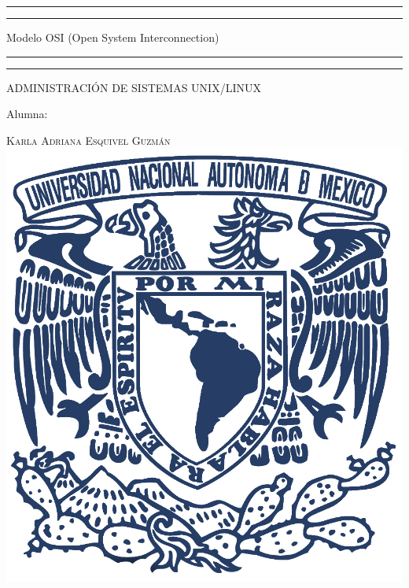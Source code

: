 \documentclass[a4paper, 11pt, oneside]{article}
\begin{document}
 

\begin{titlepage} 

	\centering 
	
	\scshape 
	
	\vspace*{\baselineskip} 
	
	
	
	\rule{\textwidth}{1.6pt}\vspace*{-\baselineskip}\vspace*{2pt} 
	\rule{\textwidth}{0.4pt} 
	
	\vspace{0.75\baselineskip} 
	
	{\LARGE Modelo OSI (Open System Interconnection)}	
	\vspace{0.75\baselineskip} 
	
	\rule{\textwidth}{0.4pt}\vspace*{-\baselineskip}\vspace{3.2pt}
	\rule{\textwidth}{1.6pt} 
	
	\vspace{2\baselineskip} 
	

	ADMINISTRACIÓN DE SISTEMAS UNIX/LINUX
	
	\vspace*{3\baselineskip} 
	
	
	
	Alumna:
	
	\vspace{0.5\baselineskip} 
	
	{\scshape\Large Karla Adriana Esquivel Guzmán \\} 
	\vspace{0.5\baselineskip} 
	\vfill
	\includegraphics{unam.jpg}
	

\end{titlepage}
\end{document}
